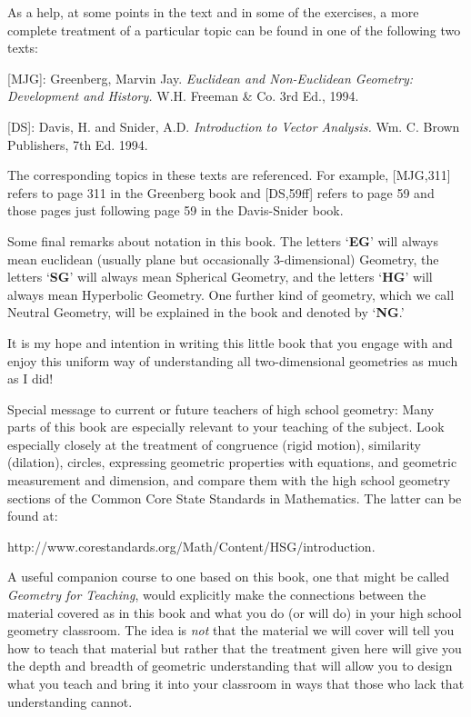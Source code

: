 \documentclass{ximera}
\begin{document}
As a help, at some points in the text and in some of the exercises, a more
complete treatment of a particular topic can be found in one of the following
two texts:

[MJG]: Greenberg, Marvin Jay. \textit{Euclidean and Non-Euclidean Geometry:
Development and History.} W.H. Freeman \& Co. 3rd Ed., 1994.

[DS]: Davis, H. and Snider, A.D. \textit{Introduction to Vector Analysis.} Wm.
C. Brown Publishers, 7th Ed. 1994.

The corresponding topics in these texts are referenced. For example, [MJG,311]
refers to page 311 in the Greenberg book and [DS,59ff] refers to page 59 and
those pages just following page 59 in the Davis-Snider book.

Some final remarks about notation in this book. The letters `\textbf{EG}' will
always mean euclidean (usually plane but occasionally $3$-dimensional)
Geometry, the letters `\textbf{SG}' will always mean Spherical Geometry, and
the letters `\textbf{HG}' will always mean Hyperbolic Geometry. One further
kind of geometry, which we call Neutral Geometry, will be explained in the
book and denoted by `\textbf{NG}.'



It is my hope and intention in writing this little book that you engage with
and enjoy this uniform way of understanding all two-dimensional geometries as
much as I did!

\begin{remark}
Special message to current or future teachers of high school geometry:
Many parts of this book are especially relevant to your teaching of
the subject. Look especially closely at the treatment of congruence
(rigid motion), similarity (dilation), circles, expressing geometric
properties with equations, and geometric measurement and dimension,
and compare them with the high school geometry sections of the Common
Core State Standards in Mathematics. The latter can be found at:
\end{remark}

\begin{center}
http://www.corestandards.org/Math/Content/HSG/introduction.
\end{center}

A useful companion course to one based on this book, one that might be
called \textit{Geometry for Teaching}, would explicitly make the
connections between the material covered as in this book and what you
do (or will do) in your high school geometry classroom. The idea is
\textit{not} that the material we will cover will tell you how to
teach that material but rather that the treatment given here will give
you the depth and breadth of geometric understanding that will allow
you to design what you teach and bring it into your classroom in ways
that those who lack that understanding cannot.
\end{document}
